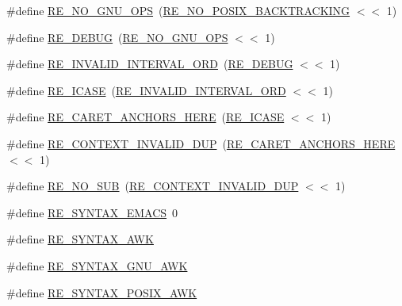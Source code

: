 \begin{DoxyCompactItemize}
\item 
\#define \hyperlink{a00092_af60fbd1f693bfb95fd0a80caae9aa4c5}{R\+E\+\_\+\+N\+O\+\_\+\+G\+N\+U\+\_\+\+O\+PS}~(\hyperlink{a00092_a35cf160909ead17ad6599238a2ebdd58}{R\+E\+\_\+\+N\+O\+\_\+\+P\+O\+S\+I\+X\+\_\+\+B\+A\+C\+K\+T\+R\+A\+C\+K\+I\+NG} $<$$<$ 1)
\item 
\#define \hyperlink{a00092_a8b5102c6c1d783f324012804b26e82cb}{R\+E\+\_\+\+D\+E\+B\+UG}~(\hyperlink{a00092_af60fbd1f693bfb95fd0a80caae9aa4c5}{R\+E\+\_\+\+N\+O\+\_\+\+G\+N\+U\+\_\+\+O\+PS} $<$$<$ 1)
\item 
\#define \hyperlink{a00092_aa745ecea482e459da4e4dd64a004da90}{R\+E\+\_\+\+I\+N\+V\+A\+L\+I\+D\+\_\+\+I\+N\+T\+E\+R\+V\+A\+L\+\_\+\+O\+RD}~(\hyperlink{a00092_a8b5102c6c1d783f324012804b26e82cb}{R\+E\+\_\+\+D\+E\+B\+UG} $<$$<$ 1)
\item 
\#define \hyperlink{a00092_acbb6483f9bcf0a95c2209c5f780f7d6c}{R\+E\+\_\+\+I\+C\+A\+SE}~(\hyperlink{a00092_aa745ecea482e459da4e4dd64a004da90}{R\+E\+\_\+\+I\+N\+V\+A\+L\+I\+D\+\_\+\+I\+N\+T\+E\+R\+V\+A\+L\+\_\+\+O\+RD} $<$$<$ 1)
\item 
\#define \hyperlink{a00092_a496361cf4f9572d2f6d1911352e15834}{R\+E\+\_\+\+C\+A\+R\+E\+T\+\_\+\+A\+N\+C\+H\+O\+R\+S\+\_\+\+H\+E\+RE}~(\hyperlink{a00092_acbb6483f9bcf0a95c2209c5f780f7d6c}{R\+E\+\_\+\+I\+C\+A\+SE} $<$$<$ 1)
\item 
\#define \hyperlink{a00092_a971ea0a3bfa08571da05bdc4b0f5faf5}{R\+E\+\_\+\+C\+O\+N\+T\+E\+X\+T\+\_\+\+I\+N\+V\+A\+L\+I\+D\+\_\+\+D\+UP}~(\hyperlink{a00092_a496361cf4f9572d2f6d1911352e15834}{R\+E\+\_\+\+C\+A\+R\+E\+T\+\_\+\+A\+N\+C\+H\+O\+R\+S\+\_\+\+H\+E\+RE} $<$$<$ 1)
\item 
\#define \hyperlink{a00092_a5b2dad3a9c3b10b36424cc672a1818f4}{R\+E\+\_\+\+N\+O\+\_\+\+S\+UB}~(\hyperlink{a00092_a971ea0a3bfa08571da05bdc4b0f5faf5}{R\+E\+\_\+\+C\+O\+N\+T\+E\+X\+T\+\_\+\+I\+N\+V\+A\+L\+I\+D\+\_\+\+D\+UP} $<$$<$ 1)
\item 
\#define \hyperlink{a00092_a7365928faf49388fd134be803a3d162c}{R\+E\+\_\+\+S\+Y\+N\+T\+A\+X\+\_\+\+E\+M\+A\+CS}~0
\item 
\#define \hyperlink{a00092_af67be05b403b6e42bbb88be683e2a9e6}{R\+E\+\_\+\+S\+Y\+N\+T\+A\+X\+\_\+\+A\+WK}
\item 
\#define \hyperlink{a00092_a9eadf9d2d61caa491fe3ff09b895a029}{R\+E\+\_\+\+S\+Y\+N\+T\+A\+X\+\_\+\+G\+N\+U\+\_\+\+A\+WK}
\item 
\#define \hyperlink{a00092_a164e06f317593b352963477bdd44f7bf}{R\+E\+\_\+\+S\+Y\+N\+T\+A\+X\+\_\+\+P\+O\+S\+I\+X\+\_\+\+A\+WK}
$$
\end{DoxyCompactItemize}
